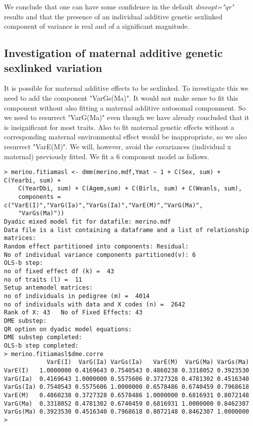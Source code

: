 \documentclass[titlepage]{article}  %
\begin{document}
We conclude that one can have some confidence in the default {\em dmeopt="qr"} results and that the presence of an individual additive genetic sexlinked component of variance is real and of a significant magnitude.

\subsection{Investigation of maternal additive genetic sexlinked variation}
It is possible for maternal additive effects to be sexlinked.  To investigate this we need to add the component "VarGs(Ma)". It would not make sense to fit this component without also fitting a maternal additive autosomal componment. So we need to resurrect "VarG(Ma)" even though we have already concluded that it is insignificant for most traits. Also to fit maternal genetic effects without a corresponding maternal environmental effect would be inappropriate, so we also resurrect "VarE(M)".  We will, however, avoid the covariances (individual x maternal) previously fitted. We fit a 6 component model as follows.

\begin{verbatim}
> merino.fitiamasl <- dmm(merino.mdf,Ymat ~ 1 + C(Sex, sum) + C(Yearbi, sum) +
    C(YearDbi, sum) + C(Agem,sum) + C(Birls, sum) + C(Weanls, sum),
    components = c("VarE(I)","VarG(Ia)","VarGs(Ia)","VarE(M)","VarG(Ma)",
    "VarGs(Ma)"))
Dyadic mixed model fit for datafile: merino.mdf  
Data file is a list containing a dataframe and a list of relationship matrices:
Random effect partitioned into components: Residual:
No of individual variance components partitioned(v): 6 
OLS-b step:
no of fixed effect df (k) =  43 
no of traits (l) =  11 
Setup antemodel matrices:
no of individuals in pedigree (m) =  4014 
no of individuals with data and X codes (n) =  2642 
Rank of X: 43   No of Fixed Effects: 43 
DME substep:
QR option on dyadic model equations:
DME substep completed:
OLS-b step completed:
> merino.fitiamasl$dme.corre
            VarE(I)  VarG(Ia) VarGs(Ia)   VarE(M)  VarG(Ma) VarGs(Ma)
VarE(I)   1.0000000 0.4169643 0.7540543 0.4860238 0.3318052 0.3923530
VarG(Ia)  0.4169643 1.0000000 0.5575606 0.3727328 0.4781302 0.4516340
VarGs(Ia) 0.7540543 0.5575606 1.0000000 0.6578486 0.6740459 0.7968618
VarE(M)   0.4860238 0.3727328 0.6578486 1.0000000 0.6816931 0.8072148
VarG(Ma)  0.3318052 0.4781302 0.6740459 0.6816931 1.0000000 0.8462307
VarGs(Ma) 0.3923530 0.4516340 0.7968618 0.8072148 0.8462307 1.0000000
>
\end{verbatim}
\end{document}
